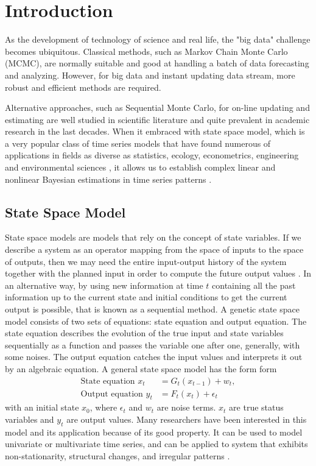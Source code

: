 
\section{Introduction}

As the development of technology of science and real life, the "big data" challenge becomes ubiquitous. Classical methods, such as Markov Chain Monte Carlo (MCMC), are normally suitable and good at handling a batch of data forecasting and analyzing. However, for big data and instant updating data stream, more robust and efficient methods are required. 


Alternative approaches, such as Sequential Monte Carlo, for on-line updating and estimating are well studied in scientific literature and quite prevalent in academic research in the last decades. When it embraced with  state space model, which is a very popular class of time series models that have found numerous of applications in fields as diverse as statistics, ecology, econometrics, engineering and environmental sciences \cite{cappe2009inference} \cite{smcmip2011} \cite{elliott1995estimation} \cite{cargnoni1997bayesian}, it allows us to establish complex linear and nonlinear Bayesian estimations in time series patterns \cite{vieira2016online}. 


\subsection*{State Space Model}

State space models are models that rely on the concept of state variables. If we describe a system as an operator mapping from the space of inputs to the space of outputs, then we may need the entire input-output history of the system together with the planned input in order to compute the future output values \cite{hangos2006analysis}. In an alternative way, by using new information at time $t$ containing all the past information up to the current state and initial conditions to get the current output is possible, that is known as a sequential method. A genetic state space model consists of two sets of equations: state equation and output equation. The state equation describes the evolution of the true input and state variables sequentially as a function and passes the variable one after one, generally, with some noises. The output equation catches the input values and interprets it out by an algebraic equation. A general state space model has the form form
\begin{align}\label{statemodel1}
\mbox{State equation } x_t &= G_t(x_{t-1})+w_t,\\
\label{statemodel2}
\mbox{Output equation } y_t &=F_t(x_t)+\epsilon_t
\end{align}
with an initial state $x_0$, where $\epsilon_t$ and $w_t$ are noise terms. $x_t$ are true status variables and $y_t$ are output values. Many researchers have been interested in this model and its application because of its good property. It can be used to model univariate or multivariate time series, and can be applied to system that exhibits non-stationarity, structural changes, and irregular patterns \cite{petris2009dynamic}.

